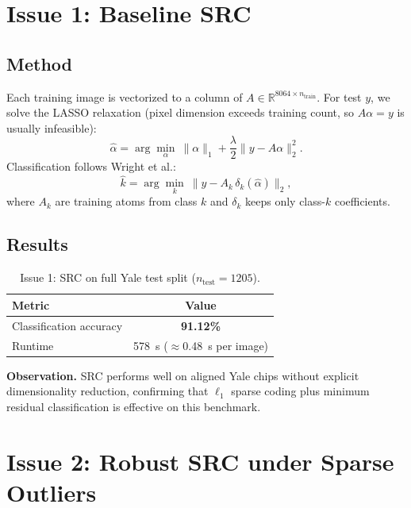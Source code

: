 \documentclass[11pt,a4paper]{article}
\begin{document}
\section{Issue 1: Baseline SRC}

\subsection{Method}

Each training image is vectorized to a column of $A\in\mathbb{R}^{8064\times n_{\mathrm{train}}}$.
For test $y$, we solve the LASSO relaxation (pixel dimension exceeds training count, so $A\alpha=y$ is
usually infeasible):
\begin{equation}
  \hat{\alpha} = \arg\min_{\alpha}\ \|\alpha\|_1 + \frac{\lambda}{2}\|y-A\alpha\|_2^2 .
  \label{eq:lasso}
\end{equation}
Classification follows Wright et al.:
\begin{equation}
  \hat{k} = \arg\min_{k}\ \bigl\| y - A_k\,\delta_k(\hat{\alpha}) \bigr\|_2 ,
\end{equation}
where $A_k$ are training atoms from class $k$ and $\delta_k$ keeps only class-$k$ coefficients.

\subsection{Results}

\begin{table}[htbp]
  \centering
  \caption{Issue 1: SRC on full Yale test split ($n_{\mathrm{test}}=1205$).}
  \label{tab:issue1}
  \begin{tabular}{lc}
    \toprule
    Metric & Value \\
    \midrule
    Classification accuracy & \textbf{91.12\%} \\
    Runtime & \SI{578}{s} ($\approx$\SI{0.48}{s} per image) \\
    \bottomrule
  \end{tabular}
\end{table}

\noindent\textbf{Observation.} SRC performs well on aligned Yale chips without explicit dimensionality reduction,
confirming that $\ell_1$ sparse coding plus minimum residual classification is effective on this benchmark.

\section{Issue 2: Robust SRC under Sparse Outliers}
\end{document}
